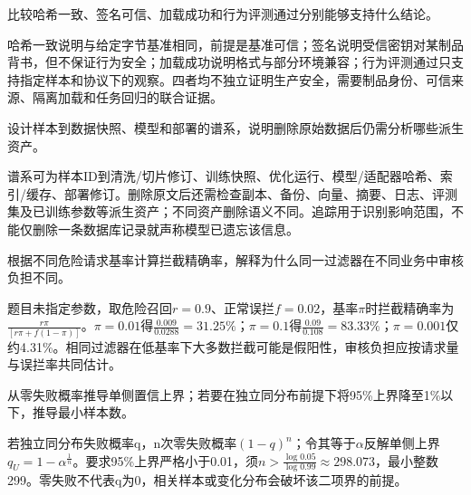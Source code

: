 \begin{exercises}
\begin{exercise} 比较哈希一致、签名可信、加载成功和行为评测通过分别能够支持什么结论。

\begin{solution}
哈希一致说明与给定字节基准相同，前提是基准可信；签名说明受信密钥对某制品背书，但不保证行为安全；加载成功说明格式与部分环境兼容；行为评测通过只支持指定样本和协议下的观察。四者均不独立证明生产安全，需要制品身份、可信来源、隔离加载和任务回归的联合证据。
\end{solution}
\end{exercise}

\begin{exercise}\optional 设计样本到数据快照、模型和部署的谱系，说明删除原始数据后仍需分析哪些派生资产。

\begin{solution}
谱系可为样本ID到清洗/切片修订、训练快照、优化运行、模型/适配器哈希、索引/缓存、部署修订。删除原文后还需检查副本、备份、向量、摘要、日志、评测集及已训练参数等派生资产；不同资产删除语义不同。追踪用于识别影响范围，不能仅删除一条数据库记录就声称模型已遗忘该信息。
\end{solution}
\end{exercise}

\begin{exercise} 根据不同危险请求基率计算拦截精确率，解释为什么同一过滤器在不同业务中审核负担不同。

\begin{solution}
题目未指定参数，取危险召回$r=0.9$、正常误拦$f=0.02$，基率$\pi$时拦截精确率为 $\frac{r\pi}{[r\pi+f(1-\pi)]}$。$\pi=0.01$得$\frac{0.009}{0.0288}=31.25\%$；$\pi=0.1$得$\frac{0.09}{0.108}=83.33\%$；$\pi=0.001$仅约4.31\%。相同过滤器在低基率下大多数拦截可能是假阳性，审核负担应按请求量与误拦率共同估计。
\end{solution}
\end{exercise}

\begin{exercise} 从零失败概率推导单侧置信上界；若要在独立同分布前提下将95\%上界降至1\%以下，推导最小样本数。

\begin{solution}
若独立同分布失败概率q，n次零失败概率$(1-q)^n$；令其等于$\alpha$反解单侧上界$q_U=1-\alpha^{\frac{1}{n}}$。要求95\%上界严格小于0.01，须$n>\frac{\log0.05}{\log0.99}\approx298.073$，最小整数299。零失败不代表q为0，相关样本或变化分布会破坏该二项界的前提。
\end{solution}
\end{exercise}


\end{exercises}
